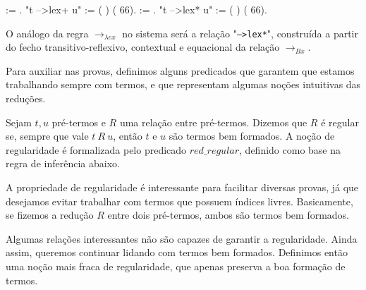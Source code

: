 \smallskip

\coqdocnoindent
{}    :=    .\coqdoceol
\coqdocnoindent
{} "t -->lex+ u" := (  ) (  66).\coqdoceol
\coqdocemptyline
\coqdocnoindent
{}    :=    .\coqdoceol
\coqdocnoindent
{} "t -->lex* u" := (  ) (  66).\coqdoceol

\bigskip

O análogo da regra $\rightarrow_{\lambda ex}$ no sistema será a relação
"\texttt{-->lex*}", construída a partir do fecho transitivo-reflexivo,
contextual e equacional da relação $\rightarrow_{Bx}$.

Para auxiliar nas provas, definimos alguns predicados que garantem que estamos
trabalhando sempre com termos, e que representam algumas noções intuitivas das
reduções.

\begin{definicao}[Regularidade]
    Sejam $t, u$ pré-termos e $R$ uma relação entre pré-termos.
    Dizemos que $R$ é regular se, sempre que vale $t\ R\ u$, então $t$ e $u$ são
    termos bem formados. A noção de regularidade é formalizada pelo predicado
    $red\_regular$, definido como base na regra de inferência abaixo.
    
\end{definicao}


A propriedade de regularidade é interessante para facilitar diversas provas,
já que desejamos evitar trabalhar com termos que possuem índices livres.
Basicamente, se fizemos a redução $R$ entre dois pré-termos,
ambos são termos bem formados.

Algumas relações interessantes não são capazes de garantir a regularidade. Ainda
assim, queremos continuar lidando com termos bem formados. Definimos então uma
noção mais fraca de regularidade, que apenas preserva a boa formação de termos.

